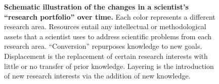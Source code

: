 \documentclass{article}
\begin{document}
\begin{figure}[h]

    \caption{\textbf{Schematic illustration of the changes in a scientist's ``research portfolio'' over time.} Each color represents a different research area. Resources entail any intellectual or methodological assets that a scientist uses to address scientific problems from each research area. ``Conversion'' repurposes knowledge to new goals. Displacement is the replacement of certain research interests with little or no transfer of prior knowledge. Layering is the introduction of new research interests via the addition of new knowledge.}
    \label{fig:research-agenda}
\end{figure}
\end{document}
